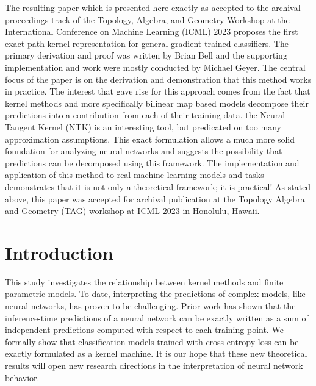 The resulting paper which is presented here exactly as accepted to the
archival proceedings track of the Topology, Algebra, and Geometry
Workshop at the International Conference on Machine Learning (ICML)
2023 proposes the first exact path kernel
representation for general gradient trained classifiers. The primary
derivation and proof was written by Brian Bell and the supporting
implementation and work were mostly conducted by Michael Geyer. The
central focus of the paper is on the derivation and demonstration that
this method works in practice. The interest that gave rise for this
approach comes from the fact that kernel methods and more specifically
bilinear map based models decompose their predictions into a
contribution from each of their training data. the Neural Tangent
Kernel (NTK) is an interesting tool, but predicated on too many
approximation assumptions. This exact formulation allows a much more
solid foundation for analyzing neural networks and suggests the
possibility that predictions can be decomposed using this
framework. The implementation and application of this method to real
machine learning models and tasks demonstrates that it is not only a
theoretical framework; it is practical! As stated above, this paper
was accepted for archival publication at the Topology Algebra and
Geometry (TAG) workshop at ICML 2023 in Honolulu, Hawaii.

\section{Introduction}

This study investigates the relationship between kernel methods and finite parametric models. To date, interpreting the predictions of complex models, like neural networks, has proven to be challenging. Prior work has shown that the inference-time predictions of a neural network can be exactly written as a sum of independent predictions computed with respect to each training point. We formally show that classification models trained with cross-entropy loss can be exactly formulated as a kernel machine. It is our hope that these new theoretical results will open new research directions in the interpretation of neural network behavior.






